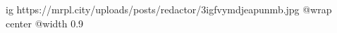  
 
 
 
 

\ifcmt
  ig https://mrpl.city/uploads/posts/redactor/3igfvymdjeapunmb.jpg
  @wrap center
  @width 0.9
\fi
